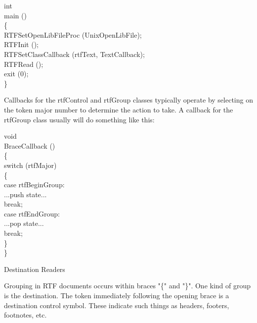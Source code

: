 \documentclass{article}
\begin{document}
\noindent
{\small int\\
main ()\\
\{	\\
RTFSetOpenLibFileProc (UnixOpenLibFile);	\\
RTFInit ();	\\
RTFSetClassCallback (rtfText, TextCallback);	\\
RTFRead ();	\\
exit (0);\\
\}



}
\noindent
Callbacks for the rtfControl and rtfGroup classes typically operate by selecting 
on the token major number to determine the action to take. A callback for 
the rtfGroup class usually will do something like this:




\noindent
void\\
BraceCallback ()\\
\{	\\
switch (rtfMajor)	\\
\{	\\
case rtfBeginGroup:		\\
...push state...		\\
break;	\\
case rtfEndGroup:		\\
...pop state...		\\
break;	\\
\}\\
\}






\noindent
Destination Readers






\noindent
Grouping in RTF documents occurs within braces "\{" and "\}". One kind of 
group is the destination. The token immediately following the opening brace 
is a destination control symbol. These indicate such things as headers, footers, 
footnotes, etc.
\end{document}
